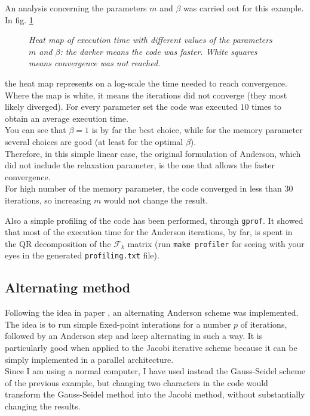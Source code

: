 \documentclass[12pt]{article}
\begin{document}
			An analysis concerning the parameters $m$ and $\beta$ was carried out for this example. In fig. \ref{fig:Heat}
			\begin{figure}
			{\scriptsize
			}
			\centering
			\caption{\textit{Heat map of execution time with different values of the parameters $m$ and $\beta$: the darker means the code was faster. White squares means
			convergence was not reached.}}
			\label{fig:Heat}
			\end{figure}
			the heat map represents on a log-scale the time needed to reach convergence.
			Where the map is white, it means the iterations did not converge (they most likely
			diverged). For every parameter set the code was executed $10$ times to obtain an average execution time.\\
			You can see that $\beta=1$ is by far the best choice, while for the memory parameter
			several choices are good (at least for the optimal $\beta$).\\
			Therefore, in this simple linear case, the original formulation
			of Anderson, which did not include the relaxation parameter, is the one that allows the faster convergence.\\
			For high number of the memory parameter, the code converged in less than
			$30$	iterations, so increasing $m$ would not change the result.
			
			Also a simple profiling of the code has been performed, through \verb|gprof|. It showed
			that most of the execution time for the Anderson iterations, by far, is spent
			in the QR decomposition of the $\mathscr{F}_k$ matrix (run
			\verb|make profiler| for seeing with your eyes in the generated \verb|profiling.txt| file).
			
		\subsection{Alternating method}
			Following the idea in paper \cite{Pratapa}, an alternating Anderson scheme was implemented.\\
			The idea is to run simple fixed-point interations for a number $p$ of iterations, followed by
			an Anderson step and keep alternating in such a way. It is particularly good when applied
			to the Jacobi iterative scheme because it can be simply implemented
			in a parallel architecture.\\
			Since I am using a normal computer, I have used instead the Gauss-Seidel scheme of the previous example,
			but changing two characters in the code would transform the Gauss-Seidel method into the Jacobi method,
			without substantially changing the results.
			
\end{document}
